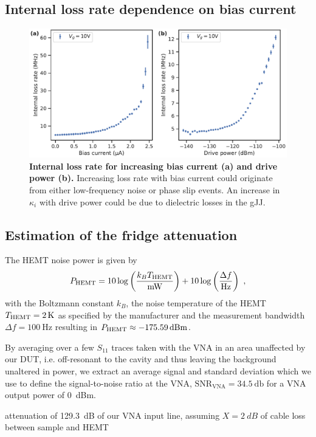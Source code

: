 \subsection{Internal loss rate dependence on bias current}\label{sec:kintib}

\begin{figure}
	\centering
	\includegraphics[width=0.583\linewidth]{chapter-gJJ-CPR/figs/SMFigure-lossrates}
	\caption{
		\textbf{Internal loss rate for increasing bias current (a) and drive power (b).}
		Increasing loss rate with bias current could originate from either low-frequency noise or phase slip events.
		An increase in $\kappa_i$ with drive power could be due to dielectric losses in the gJJ.
	}
	\label{fig:SMFig-lossrates}
\end{figure}


\subsection{Estimation of the fridge attenuation}\label{sec:attenuation}
The HEMT noise power is given by
%
\begin{align}
P_{\rm HEMT}=10\log\left(\frac{k_B T_{\rm HEMT}}{\si{\milli\watt}}\right) + 10\log\left(\frac{\Delta f}{\si{\hertz}}\right)\ ,
\label{eq:HEMT}
\end{align}
%
with the Boltzmann constant $k_B$, the noise temperature of the HEMT $T_{\rm HEMT}=\SI{2}{\kelvin}$ as specified by the manufacturer and the measurement bandwidth $\Delta f=\SI{100}{\hertz}$ resulting in $P_{\rm HEMT}\approx\SI{-175.59}{dBm}$.

By averaging over a few $S_{11}$ traces taken with the VNA in an area unaffected by our DUT, i.e. off-resonant to the cavity and thus leaving the background unaltered in power, we extract an average signal and standard deviation which we use to define the signal-to-noise ratio at the VNA, $\text{SNR}_\text{VNA}=\SI{34.5}{\decibel}$ for a VNA output power of \SI{0}{dBm}.

attenuation of \SI{129.3}{dB} of our VNA input line, assuming $X=\SI{2}{dB}$ of cable loss between sample and HEMT


